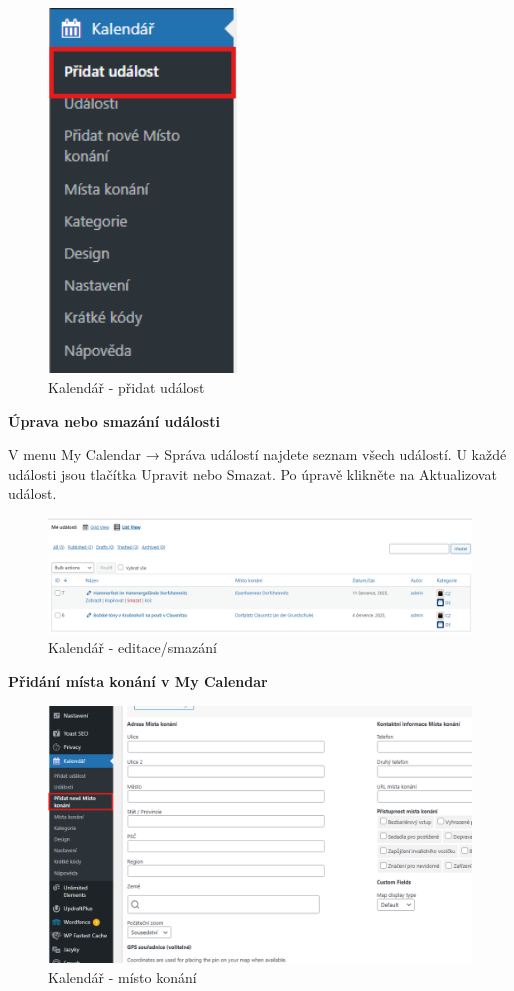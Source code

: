 \documentclass[12pt,a4paper]{article}
\begin{document}
	\begin{figure}[htp]
		\centering
		\includegraphics[width=5cm]{WPcalendarEventCreate.png}
		\caption{Kalendář - přidat událost}
		\label{fig:role}
	\end{figure}
	
	\textbf{Úprava nebo smazání události}
	
	V menu My Calendar → Správa událostí najdete seznam všech událostí. U každé události jsou tlačítka Upravit nebo Smazat. Po úpravě klikněte na Aktualizovat událost.
	
	\begin{figure}[htp]
		\centering
		\includegraphics[width=15cm]{WPcalendarEventDelete.png}
		\caption{Kalendář - editace/smazání}
		\label{fig:role}
	\end{figure}

	
	\newpage
	\textbf{Přidání místa konání v My Calendar}
	
	
	\begin{figure}[htp]
		\centering
		\includegraphics[width=15cm]{WPcalendarLocationCreate.png}
		\caption{Kalendář - místo konání}
		\label{fig:role}
	\end{figure}
	
\end{document}

